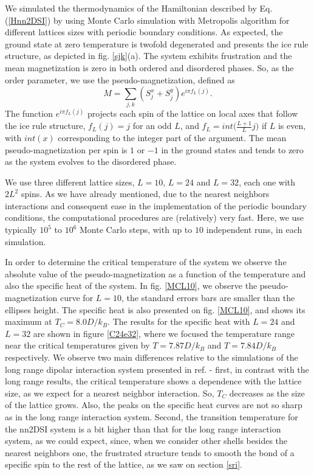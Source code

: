 \documentclass[aps,showkeys,groupedaddress]{revtex4}
\begin{document}
We simulated the thermodynamics of the Hamiltonian described by Eq. (\ref{Hnn2DSI}) by using Monte Carlo simulation with Metropolis algorithm for different lattices sizes with periodic boundary conditions. As expected, the ground state at zero temperature is twofold degenerated and presents the ice rule structure, as depicted in fig. \ref{sjk}(a). The system exhibits frustration and the mean magnetization is zero in both ordered and disordered phases. So, as the order parameter, we use the pseudo-magnetization, defined as
\begin{equation}
M = \sum_{j,k} (S^x_{j} + S^y_{j}) e^{i\pi f_L(j)}.
\end{equation}
The function $e^{i\pi f_L(j)}$ projects each spin of the lattice on local axes that follow the ice rule structure, $f_L(j)=j$ for an odd $L$, and $f_L = int\Big(\frac{L+1}{L}j\Big)$ if $L$ is even, with $int(x)$ corresponding to the integer part of the argument. The mean pseudo-magnetization per spin is $1$ or $-1$ in the ground states and tends to zero as the system evolves to the disordered phase. 

We use three different lattice sizes, $L=10$, $L=24$ and $L=32$, each one with $2L^2$ spins. As we have already mentioned, due to the nearest neighbors interactions and consequent ease in the implementation of the periodic boundary conditions, the computational procedures are (relatively) very fast. Here, we use typically $10^5$ to $10^6$ Monte Carlo steps, with up to $10$ independent runs, in each simulation. 

In order to determine the critical temperature of the system we observe the absolute value of the pseudo-magnetization as a function of the temperature and also the specific heat of the system. In fig. \ref{MCL10}, we observe the pseudo-magnetization curve for $L=10$, the standard errors bars are smaller than the ellipses height. The specific heat is also presented on fig. \ref{MCL10}, and shows its maximum at $T_C=8.0 D/k_B$. The results for the specific heat with $L=24$ and $L=32$ are shown in figure \ref{C24e32}, where we focused the temperature range near the critical temperatures given by $T= 7.87 D/k_B$ and $T=7.84 D/k_B$ respectively. We observe two main differences relative to the simulations of the long range dipolar interaction system presented in ref. \cite{Silva2012,Li2013} - first, in contrast with the long range results, the critical temperature shows a dependence with the lattice size, as we expect for a nearest neighbor interaction. So, $T_C$ decreases as the size of the lattice grows. Also, the peaks on the specific heat curves are not so sharp as in the long range interaction system. Second, the transition temperature for the nn2DSI system is a bit higher than that for the long range interaction system, as we could expect, since, when we consider other shells besides the nearest neighbors one, the frustrated structure tends to smooth the bond of a specific spin to the rest of the lattice, as we saw on section \ref{sri}. 
\end{document}
